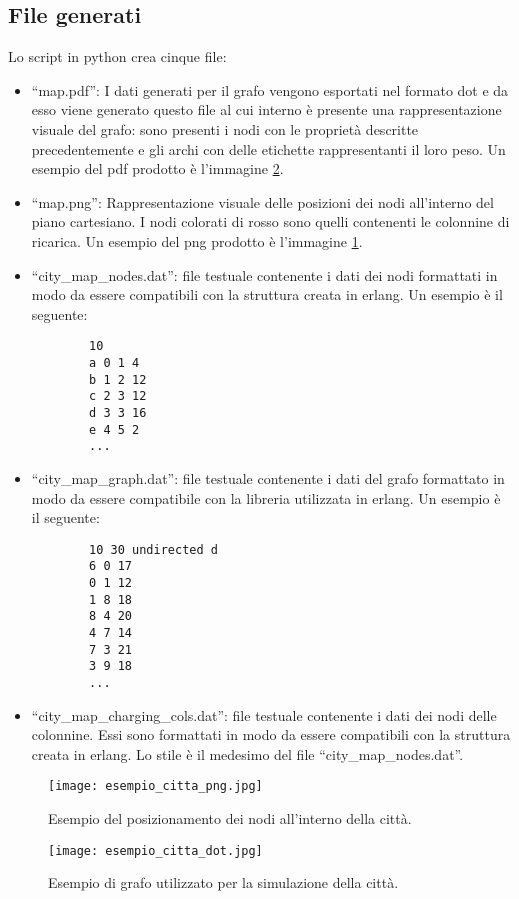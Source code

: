 \subsection{File generati}
Lo script in python crea cinque file:
\begin{itemize}
	\item ``map.pdf'': I dati generati per il grafo vengono esportati nel formato dot e da esso viene generato questo file al cui interno è presente una rappresentazione visuale del grafo: sono presenti i nodi con le proprietà descritte precedentemente e gli archi con delle etichette rappresentanti il loro peso. Un esempio del pdf prodotto è l'immagine \ref{fig:esempio_citta_dot}.
	\item ``map.png'': Rappresentazione visuale delle posizioni dei nodi all'interno del piano cartesiano. I nodi colorati di rosso sono quelli contenenti le colonnine di ricarica. Un esempio del png prodotto è l'immagine \ref{fig:esempio_citta_png}.
	\item ``city\_map\_nodes.dat'': file testuale contenente i dati dei nodi formattati in modo da essere compatibili con la struttura creata in erlang. Un esempio è il seguente:
	\begin{lstlisting}
		10
		a 0 1 4
		b 1 2 12
		c 2 3 12
		d 3 3 16
		e 4 5 2
		...
	\end{lstlisting}
	\item ``city\_map\_graph.dat'': file testuale contenente i dati del grafo formattato in modo da essere compatibile con la libreria utilizzata in erlang. Un esempio è il seguente:
	\begin{lstlisting}
		10 30 undirected d
		6 0 17
		0 1 12
		1 8 18
		8 4 20
		4 7 14
		7 3 21
		3 9 18
		...
	\end{lstlisting}
	\item ``city\_map\_charging\_cols.dat'': file testuale contenente i dati dei nodi delle colonnine. Essi sono formattati in modo da essere compatibili con la struttura creata in erlang. Lo stile è il medesimo del file ``city\_map\_nodes.dat''.
	
\end{itemize}

\begin{figure}[htbp]
	\centering
	\texttt{[image: esempio\_citta\_png.jpg]}
	\caption{Esempio del posizionamento dei nodi all'interno della città.}
	\label{fig:esempio_citta_png}
\end{figure}

\begin{figure}[htbp]
	\centering
	\texttt{[image: esempio\_citta\_dot.jpg]}
	\caption{Esempio di grafo utilizzato per la simulazione della città.}
	\label{fig:esempio_citta_dot}
\end{figure}

